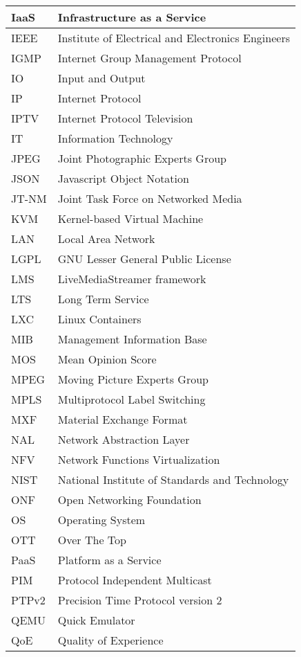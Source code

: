 \begin{longtable}{p{} p{}}
\hline
IaaS & Infrastructure as a Service \\
\hline
IEEE & Institute of Electrical and Electronics Engineers \\
\hline
IGMP & Internet Group Management Protocol \\
\hline
IO & Input and Output \\
\hline
IP & Internet Protocol \\
\hline
IPTV & Internet Protocol Television \\
\hline
IT & Information Technology \\
\hline
JPEG &  Joint Photographic Experts Group \\
\hline
JSON &  Javascript Object Notation \\
\hline
JT-NM &  Joint Task Force on Networked Media \\
\hline
KVM &  Kernel-based Virtual Machine \\
\hline
LAN &  Local Area Network \\
\hline
LGPL & GNU Lesser General Public License \\
\hline
LMS &  LiveMediaStreamer framework \\
\hline
LTS & Long Term Service \\
\hline
LXC &  Linux Containers \\
\hline
MIB & Management Information Base \\
\hline
MOS & Mean Opinion Score \\
\hline
MPEG & Moving Picture Experts Group \\
\hline
MPLS & Multiprotocol Label Switching \\
\hline
MXF & Material Exchange Format \\
\hline
NAL & Network Abstraction Layer \\
\hline
NFV & Network Functions Virtualization \\
\hline
NIST & National Institute of Standards and Technology \\
\hline
ONF & Open Networking Foundation \\
\hline
OS & Operating System \\
\hline
OTT & Over The Top \\
\hline
PaaS & Platform as a Service \\
\hline
PIM & Protocol Independent Multicast \\
\hline
PTPv2 & Precision Time Protocol version 2 \\
\hline
QEMU & Quick Emulator \\
\hline
QoE & Quality of Experience \\

\end{longtable}
